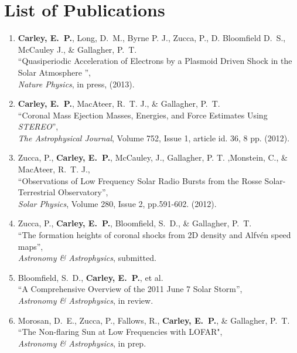 \chapter{List of Publications}
\label{chapter:publications}


\begin{enumerate}

\item \textbf{Carley, E.~P.}, Long, D.~M., Byrne P. J., Zucca, P., D. Bloomfield D.~S., McCauley J., \& Gallagher, P.~T.\\
``Quasiperiodic Acceleration of Electrons by a Plasmoid Driven Shock in the Solar Atmosphere '', \\
\emph{Nature Physics}, in press, (2013).

\item \textbf{Carley, E.~P.}, MacAteer, R.~T. J., \& Gallagher, P.~T.\\
``Coronal Mass Ejection Masses, Energies, and Force Estimates Using \emph{STEREO}'', \\
\emph{The Astrophysical Journal}, Volume 752, Issue 1, article id. 36, 8 pp. (2012).

\item Zucca, P., \textbf{Carley, E.~P.},  McCauley, J., Gallagher, P. T. ,Monstein, C., \& MacAteer, R.~T. J.,\\
``Observations of Low Frequency Solar Radio Bursts from the Rosse Solar-Terrestrial Observatory'', \\
\emph{Solar Physics}, Volume 280, Issue 2, pp.591-602. (2012).

\item Zucca, P., \textbf{Carley, E.~P.}, Bloomfield, S.~D., \& Gallagher, P.~T.\\
``The formation heights of coronal shocks from 2D density and Alfv\'{e}n speed maps'', \\
\emph{Astronomy \& Astrophysics}, submitted.

\item Bloomfield, S.~D., \textbf{Carley, E.~P.}, et al.\\
``A Comprehensive Overview of the 2011 June 7 Solar Storm'', \\
\emph{Astronomy \& Astrophysics}, in review.

\item Morosan, D.~E., Zucca, P., Fallows, R., \textbf{Carley, E.~P.}, \& Gallagher, P.~T.
``The Non-flaring Sun at Low Frequencies with LOFAR", \\
\emph{Astronomy \& Astrophysics}, in prep.


\end{enumerate}
